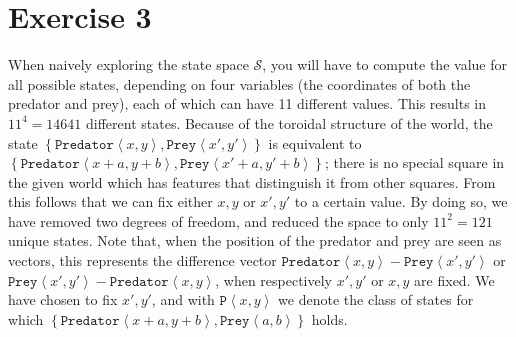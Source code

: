 \documentclass[a4paper,11pt]{article}
\newcommand{\Pred}[2]{\ensuremath{\mathtt{Predator}\left<#1, #2\right>}}
\newcommand{\Prey}[2]{\ensuremath{\mathtt{Prey}\left<#1, #2\right>}}
\newcommand{\p}[2]{\ensuremath{\mathtt{P}\left<#1, #2\right>}}
\newcommand{\DrawSmallPred}[2]{\node at (A.center #1 #2) {$\pi$};}
\newcommand{\DrawSmallPrey}[2]{\node at (A.center #1 #2) {P};}
\begin{document}
\section*{Exercise 3}
When naively exploring the state space $\mathcal{S}$, you will have to compute the value for all possible states, depending on four variables (the coordinates of both the predator and prey), each of which can have 11 different values.  This results in $11^4 = 14641$ different states.  Because of the toroidal structure of the world, the state $\left\{\Pred{x}{y}, \Prey{x'}{y'}\right\}$ is equivalent to $\left\{\Pred{x+a}{y+b}, \Prey{x'+a}{y'+b}\right\}$; there is no special square in the given world which has features that distinguish it from other squares.  From this follows that we can fix either $x, y$ or $x', y'$ to a certain value.  By doing so, we have removed two degrees of freedom, and reduced the space to only $11^2 = 121$ unique states.  Note that, when the position of the predator and prey are seen as vectors, this represents the difference vector $\Pred{x}{y} - \Prey{x'}{y'}$ or $\Prey{x'}{y'} - \Pred{x}{y}$, when respectively $x', y'$ or $x, y$ are fixed.  We have chosen to fix $x', y'$, and with $\p{x}{y}$ we denote the class of states for which $\left\{\Pred{x+a}{y+b}, \Prey{a}{b}\right\}$ holds.
\begin{figure}
\begin{center}
\end{center}
\end{figure}
\end{document}
